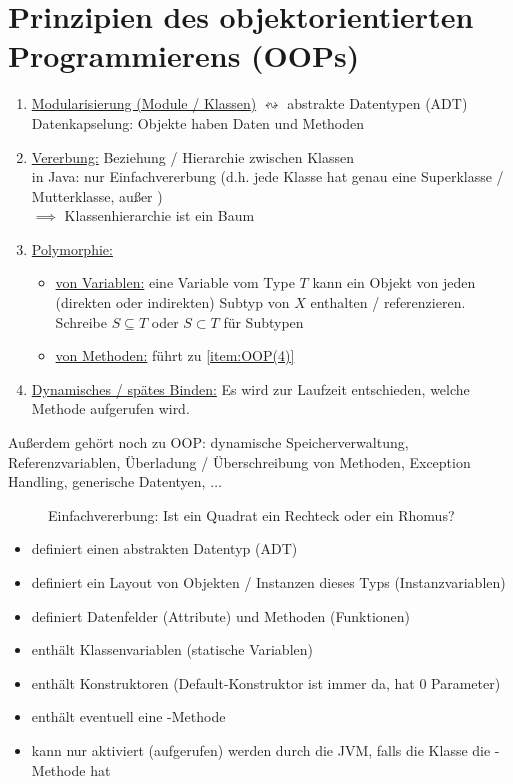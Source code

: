 \section{Prinzipien des objektorientierten Programmierens (OOPs)}
\begin{enumerate}[label=(\arabic*)]
	\item \ul{Modularisierung (Module / Klassen)} $\leftrightsquigarrow$ abstrakte Datentypen (ADT)\\
	Datenkapselung: Objekte haben Daten und Methoden
	\item \ul{Vererbung:} Beziehung / Hierarchie zwischen Klassen\\
	in Java: nur Einfachvererbung (d.h. jede Klasse hat genau eine Superklasse / Mutterklasse, außer )\\
	$\implies$ Klassenhierarchie ist ein Baum
	\item \ul{Polymorphie:}
	\begin{itemize}
		\item \ul{von Variablen:} eine Variable vom Type $T$ kann ein Objekt von jeden (direkten oder indirekten) Subtyp von $X$ enthalten / referenzieren.\\
		Schreibe $S\subseteq T$ oder $S\subset T$ für Subtypen
		\item \ul{von Methoden:} führt zu \ref{item:OOP(4)}
	\end{itemize}
	\item \ul{Dynamisches / spätes Binden:}\label{item:OOP(4)}
	Es wird zur Laufzeit entschieden, welche Methode aufgerufen wird.
\end{enumerate}

Außerdem gehört noch zu OOP: dynamische Speicherverwaltung, Referenzvariablen, Überladung / Überschreibung von Methoden, Exception Handling, generische Datentyen, $\ldots$

\begin{figure}[H] %
	\begin{center}
		
		\caption{Einfachvererbung: Ist ein Quadrat ein Rechteck oder ein Rhomus?}
		\label{Abb:einfachvererbung}
	\end{center}
\end{figure}

\begin{itemize}
	\item definiert einen abstrakten Datentyp (ADT)
	\item definiert ein Layout von Objekten / Instanzen dieses Typs (Instanzvariablen)
	\item definiert Datenfelder (Attribute) und Methoden (Funktionen)
	\item enthält Klassenvariablen (statische Variablen)
	\item enthält Konstruktoren (Default-Konstruktor ist immer da, hat 0 Parameter)
	\item enthält eventuell eine -Methode
	\item kann nur aktiviert (aufgerufen) werden durch die JVM, falls die Klasse die -Methode hat
\end{itemize}

